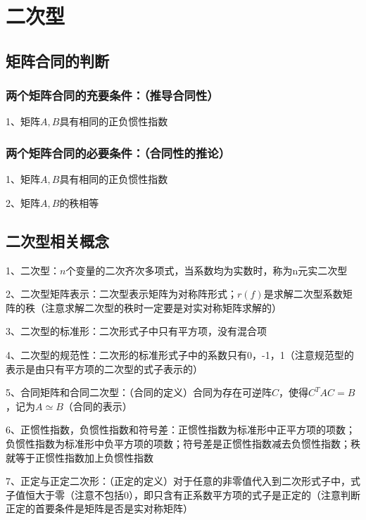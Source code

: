 \chapter{二次型}

\section{矩阵合同的判断}



\subsection{两个矩阵合同的充要条件：（推导合同性）}

1、矩阵$A,B$具有相同的正负惯性指数



\subsection{两个矩阵合同的必要条件：（合同性的推论）}

1、矩阵$A,B$具有相同的正负惯性指数

2、矩阵$A,B$的秩相等

\section{二次型相关概念}

1、二次型：$n$个变量的二次齐次多项式，当系数均为实数时，称为n元实二次型

2、二次型矩阵表示：二次型表示矩阵为对称阵形式；$r(f)$是求解二次型系数矩阵的秩（注意求解二次型的秩时一定要是对实对称矩阵求解的）

3、二次型的标准形：二次形式子中只有平方项，没有混合项

4、二次型的规范性：二次形的标准形式子中的系数只有0，-1，1（注意规范型的表示是由只有平方项的二次型的式子表示的）

5、合同矩阵和合同二次型：（合同的定义）合同为存在可逆阵$C$，使得$C^TAC=B$，记为$A \simeq B$（合同的表示）

6、正惯性指数，负惯性指数和符号差：正惯性指数为标准形中正平方项的项数；负惯性指数为标准形中负平方项的项数；符号差是正惯性指数减去负惯性指数；秩就等于正惯性指数加上负惯性指数

7、正定与正定二次形：（正定的定义）对于任意的非零值代入到二次形式子中，式子值恒大于零（注意不包括0），即只含有正系数平方项的式子是正定的（注意判断正定的首要条件是矩阵是否是实对称矩阵）

